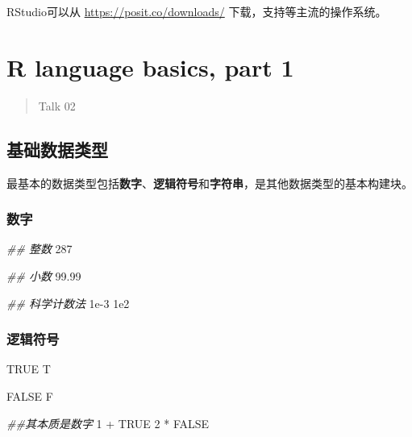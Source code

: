 \documentclass[
]{article}
\newenvironment{Shaded}{}{}
\newcommand{\ConstantTok}[1]{\textcolor[rgb]{0.53,0.00,0.00}{#1}}
\newcommand{\DecValTok}[1]{\textcolor[rgb]{0.25,0.63,0.44}{#1}}
\newcommand{\DocumentationTok}[1]{\textcolor[rgb]{0.73,0.13,0.13}{\textit{#1}}}
\newcommand{\FloatTok}[1]{\textcolor[rgb]{0.25,0.63,0.44}{#1}}
\newcommand{\NormalTok}[1]{#1}
\newcommand{\SpecialCharTok}[1]{\textcolor[rgb]{0.25,0.44,0.63}{#1}}
\begin{document}
RStudio可以从 \url{https://posit.co/downloads/}
下载，支持等主流的操作系统。

\newpage
\hypertarget{r-language-basics-part-1}{%
\section{R language basics, part 1}\label{r-language-basics-part-1}}

\begin{quote}
Talk 02
\end{quote}

\hypertarget{ux57faux7840ux6570ux636eux7c7bux578b}{%
\subsection{基础数据类型}\label{ux57faux7840ux6570ux636eux7c7bux578b}}

最基本的数据类型包括\textbf{数字}、\textbf{逻辑符号}和\textbf{字符串}，是其他数据类型的基本构建块。

\hypertarget{ux6570ux5b57}{%
\subsubsection{\texorpdfstring{数字 }{数字 }}\label{ux6570ux5b57}}

\begin{Shaded}
\begin{Highlighting}[]
\DocumentationTok{\#\# 整数}
\DecValTok{287}

\DocumentationTok{\#\# 小数}
\FloatTok{99.99}

\DocumentationTok{\#\# 科学计数法}
\FloatTok{1e{-}3}
\FloatTok{1e2}
\end{Highlighting}
\end{Shaded}

\hypertarget{ux903bux8f91ux7b26ux53f7}{%
\subsubsection{逻辑符号}\label{ux903bux8f91ux7b26ux53f7}}

\begin{Shaded}
\begin{Highlighting}[]
\ConstantTok{TRUE}
\NormalTok{T}

\ConstantTok{FALSE}
\NormalTok{F}

\DocumentationTok{\#\#其本质是数字}
\DecValTok{1} \SpecialCharTok{+} \ConstantTok{TRUE}
\DecValTok{2} \SpecialCharTok{*} \ConstantTok{FALSE}
\end{Highlighting}
\end{Shaded}
\end{document}
